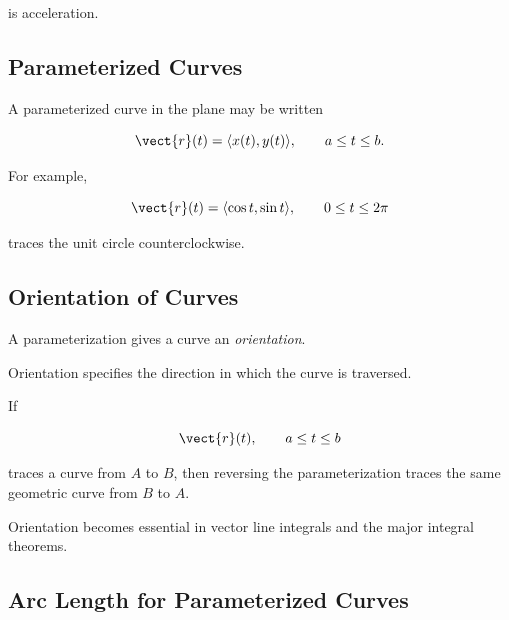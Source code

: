 is acceleration.

\subsection{Parameterized Curves}
\label{subsec:parameterized-curves-vector-calculus}

A parameterized curve in the plane may be written

\[ \vect{r}(t)=\langle x(t),y(t)\rangle,\qquad a\leq t\leq b. \]

For example,

\[ \vect{r}(t)=\langle\cos t,\sin t\rangle,\qquad0\leq t\leq2\pi \]

traces the unit circle counterclockwise.

\begin{center}
\end{center}

\subsection{Orientation of Curves}
\label{subsec:curve-orientation}

A parameterization gives a curve an \emph{orientation}.

Orientation specifies the direction in which the curve is traversed.

If

\[ \vect{r}(t),\qquad a\leq t\leq b \]

traces a curve from \(A\) to \(B\), then reversing the parameterization
traces the same geometric curve from \(B\) to \(A\).

Orientation becomes essential in vector line integrals and the major
integral theorems.

\subsection{Arc Length for Parameterized Curves}
\label{subsec:arc-length-vector-curves}

